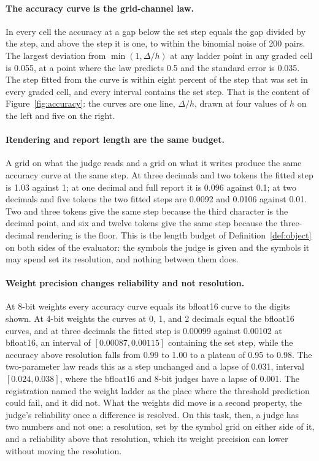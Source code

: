 \documentclass{article}
\theoremstyle{definition}
\theoremstyle{remark}
\begin{document}
\paragraph{The accuracy curve is the grid-channel law.}
In every cell the accuracy at a gap below the set step equals the gap divided by the step, and above the step it is one, to within the binomial noise of 200 pairs.
The largest deviation from $\min(1,\Delta/h)$ at any ladder point in any graded cell is 0.055, at a point where the law predicts 0.5 and the standard error is 0.035.
The step fitted from the curve is within eight percent of the step that was set in every graded cell, and every interval contains the set step.
That is the content of Figure~\ref{fig:accuracy}: the curves are one line, $\Delta/h$, drawn at four values of $h$ on the left and five on the right.

\paragraph{Rendering and report length are the same budget.}
A grid on what the judge reads and a grid on what it writes produce the same accuracy curve at the same step.
At three decimals and two tokens the fitted step is 1.03 against 1; at one decimal and full report it is 0.096 against 0.1; at two decimals and five tokens the two fitted steps are 0.0092 and 0.0106 against 0.01.
Two and three tokens give the same step because the third character is the decimal point, and six and twelve tokens give the same step because the three-decimal rendering is the floor.
This is the length budget of Definition~\ref{def:object} on both sides of the evaluator: the symbols the judge is given and the symbols it may spend set its resolution, and nothing between them does.

\paragraph{Weight precision changes reliability and not resolution.}
At 8-bit weights every accuracy curve equals its bfloat16 curve to the digits shown.
At 4-bit weights the curves at 0, 1, and 2 decimals equal the bfloat16 curves, and at three decimals the fitted step is 0.00099 against 0.00102 at bfloat16, an interval of $[0.00087,0.00115]$ containing the set step, while the accuracy above resolution falls from 0.99 to 1.00 to a plateau of 0.95 to 0.98.
The two-parameter law reads this as a step unchanged and a lapse of 0.031, interval $[0.024,0.038]$, where the bfloat16 and 8-bit judges have a lapse of 0.001.
The registration named the weight ladder as the place where the threshold prediction could fail, and it did not.
What the weights did move is a second property, the judge's reliability once a difference is resolved.
On this task, then, a judge has two numbers and not one: a resolution, set by the symbol grid on either side of it, and a reliability above that resolution, which its weight precision can lower without moving the resolution.
\end{document}

